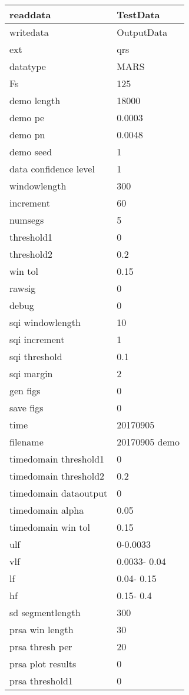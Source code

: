 \begin{tabular}{|l|l|}
\hline
readdata&TestData\\\hline
writedata&OutputData\\\hline
ext&qrs\\\hline
datatype&MARS\\\hline
Fs&125\\\hline
demo length&18000\\\hline
demo pe&0.0003\\\hline
demo pn&0.0048\\\hline
demo seed&1\\\hline
data confidence level&1\\\hline
windowlength&300\\\hline
increment&60\\\hline
numsegs&5\\\hline
threshold1&0\\\hline
threshold2&0.2\\\hline
win tol&0.15\\\hline
rawsig&0\\\hline
debug&0\\\hline
sqi windowlength&10\\\hline
sqi increment&1\\\hline
sqi threshold&0.1\\\hline
sqi margin&2\\\hline
gen figs&0\\\hline
save figs&0\\\hline
time&20170905\\\hline
filename&20170905 demo\\\hline
timedomain threshold1&0\\\hline
timedomain threshold2&0.2\\\hline
timedomain dataoutput&0\\\hline
timedomain alpha&0.05\\\hline
timedomain win tol&0.15\\\hline
ulf&     0-0.0033\\\hline
vlf&0.0033-  0.04\\\hline
lf&  0.04-  0.15\\\hline
hf&  0.15-   0.4\\\hline
sd segmentlength&300\\\hline
prsa win length&30\\\hline
prsa thresh per&20\\\hline
prsa plot results&0\\\hline
prsa threshold1&0\\\hline

\end{tabular}
